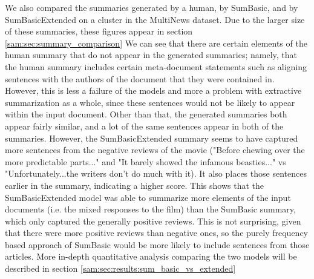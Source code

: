 \documentclass[../writeup.tex]{subfiles}
\begin{document}
We also compared the summaries generated by a human, by SumBasic, and by SumBasicExtended on a cluster in the MultiNews dataset.
Due to the larger size of these summaries, these figures appear in section \ref{sam:sec:summary_comparison}
We can see that there are certain elements of the human summary that do not appear in the generated summaries; namely, that the human summary includes certain meta-document statements such as aligning sentences with the authors of the document that they were contained in.
However, this is less a failure of the models and more a problem with extractive summarization as a whole, since these sentences would not be likely to appear within the input document.
Other than that, the generated summaries both appear fairly similar, and a lot of the same sentences appear in both of the summaries.
However, the SumBasicExtended summary seems to have captured more sentences from the negative reviews of the movie ("Before chewing over the more predictable parts..." and "It barely showed the infamous beasties..." vs "Unfortunately...the writers don't do much with it).
It also places those sentences earlier in the summary, indicating a higher score.
This shows that the SumBasicExtended model was able to summarize more elements of the input documents (i.e. the mixed responses to the film) than the SumBasic summary, which only captured the generally positive reviews.
This is not surprising, given that there were more positive reviews than negative ones, so the purely frequency based approach of SumBasic would be more likely to include sentences from those articles.
More in-depth quantitative analysis comparing the two models will be described in section \ref{sam:sec:results:sum_basic_vs_extended}
\end{document}
